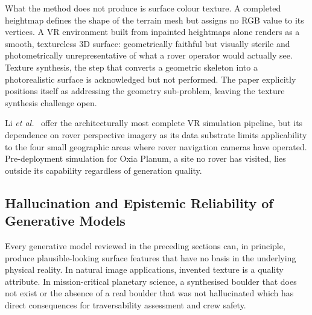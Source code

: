 \documentclass[10pt,journal]{IEEEtran}
\begin{document}
What the method does not produce is surface colour texture. A completed heightmap
defines the shape of the terrain mesh but assigns no RGB value to its vertices.
A VR environment built from inpainted heightmaps alone renders as a smooth,
textureless 3D surface: geometrically faithful but visually sterile and
photometrically unrepresentative of what a rover operator would actually see.
Texture synthesis, the step that converts a geometric skeleton into a
photorealistic surface is acknowledged but not performed. The paper explicitly
positions itself as addressing the geometry sub-problem, leaving the texture
synthesis challenge open.

Li \textit{et al.}~\cite{li2025martian} offer the architecturally most complete
VR simulation pipeline, but its dependence on rover perspective imagery as its
data substrate limits applicability to the four small geographic areas where
rover navigation cameras have operated. Pre-deployment simulation for Oxia
Planum, a site no rover has visited, lies outside its capability regardless of
generation quality.

\subsection{Hallucination and Epistemic Reliability of Generative Models}
\label{subsec:hallucination}

Every generative model reviewed in the preceding sections can, in principle,
produce plausible-looking surface features that have no basis in the underlying
physical reality. In natural image applications, invented texture is a quality
attribute. In mission-critical planetary science, a synthesised boulder that does
not exist or the absence of a real boulder that was not hallucinated which has
direct consequences for traversability assessment and crew safety.
\end{document}
